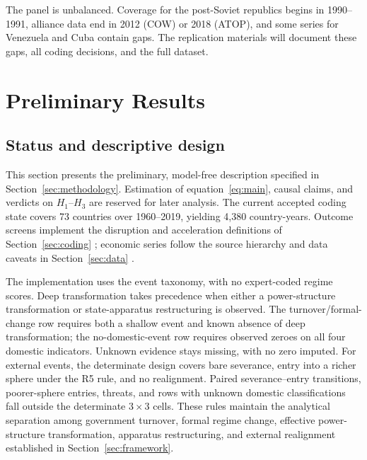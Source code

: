 \documentclass[11pt]{article}
\begin{document}
The panel is unbalanced. Coverage for the post-Soviet republics begins in 1990--1991, alliance data end in 2012 (COW) or 2018 (ATOP), and some series for Venezuela and Cuba contain gaps. The replication materials will document these gaps, all coding decisions, and the full dataset.

\section{Preliminary Results}
\label{sec:preliminary_results}

\subsection{Status and descriptive design}

This section presents the preliminary, model-free description specified in Section~\ref{sec:methodology}. Estimation of equation~\eqref{eq:main}, causal claims, and verdicts on $H_1$--$H_3$ are reserved for later analysis. The current accepted coding state covers 73 countries over 1960--2019, yielding 4,380 country-years. Outcome screens implement the disruption and acceleration definitions of Section~\ref{sec:coding} \parencite{rodrik_1999,hausmann_pritchett_rodrik_2005}; economic series follow the source hierarchy and data caveats in Section~\ref{sec:data} \parencite{worldbank_wdi,imf_weo,bolt_vanzanden_2024}.

The implementation uses the event taxonomy, with no expert-coded regime scores. Deep transformation takes precedence when either a power-structure transformation or state-apparatus restructuring is observed. The turnover/formal-change row requires both a shallow event and known absence of deep transformation; the no-domestic-event row requires observed zeroes on all four domestic indicators. Unknown evidence stays missing, with no zero imputed. For external events, the determinate design covers bare severance, entry into a richer sphere under the R5 rule, and no realignment. Paired severance--entry transitions, poorer-sphere entries, threats, and rows with unknown domestic classifications fall outside the determinate $3\times3$ cells. These rules maintain the analytical separation among government turnover, formal regime change, effective power-structure transformation, apparatus restructuring, and external realignment established in Section~\ref{sec:framework}.
\end{document}
